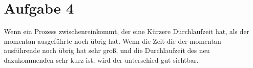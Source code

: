 \documentclass{scrartcl}
\begin{document}
\section*{Aufgabe 4}
Wenn ein Prozess zwischenreinkommt, der eine Kürzere Durchlaufzeit hat, als der momentan
ausgeführte noch übrig hat. Wenn die Zeit die der momentan ausführende noch übrig hat
sehr groß, und die Durchlaufzeit des neu dazukommenden sehr kurz ist, wird der unterschied
gut sichtbar.
\end{document}
